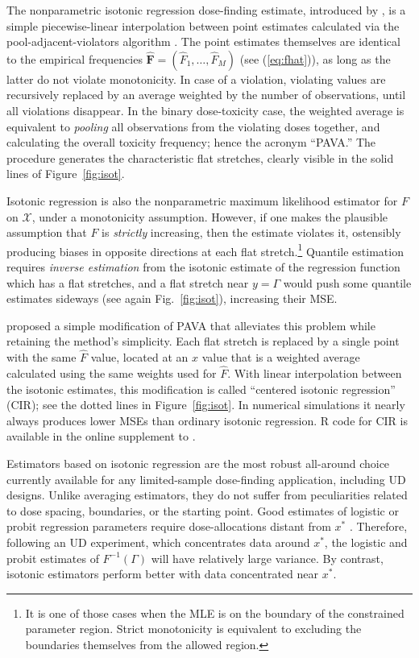 The nonparametric isotonic regression dose-finding estimate, introduced by \cite{Styl:Flou:dose:2002}, is a simple piecewise-linear interpolation between point estimates calculated via the pool-adjacent-violators algorithm \citep[PAVA,][]{BBBB:order:1972}. The point estimates themselves are identical to the empirical frequencies $\mathbf{\hat{F}}=\left(\hat{F}_1,\ldots,\hat{F}_M\right)$ (see (\ref{eq:fhat})), as long as the latter do not violate monotonicity. In case of a violation, violating values are recursively replaced by an average weighted by the number of observations, until all violations disappear. In the binary dose-toxicity case, the weighted average is equivalent to \emph{pooling} all observations from the violating doses together, and calculating the overall toxicity frequency; hence the acronym ``PAVA.'' The procedure generates the characteristic flat stretches, clearly visible in the solid lines of Figure~\ref{fig:isot}.

 Isotonic regression is also the nonparametric maximum likelihood estimator for $F$ on $\mathcal{X}$, under a monotonicity assumption. However, if one makes the plausible assumption that $F$ is \emph{strictly} increasing, then the estimate violates it, ostensibly producing biases in opposite directions at each flat stretch.\footnote{It is one of those cases when the MLE is on the boundary of the constrained parameter region. Strict monotonicity is equivalent to excluding the boundaries themselves from the allowed region.} Quantile estimation requires \emph{inverse estimation} from the isotonic estimate of the regression function which has a flat stretches, and a flat stretch near $y=\Gamma$ would push some quantile estimates sideways (see again Fig.~\ref{fig:isot}), increasing their MSE.

 \cite{Oron07} proposed a simple modification of PAVA that alleviates this problem while retaining the method's simplicity. Each flat stretch is replaced by a single point with the same $\hat{F}$ value, located at an $x$ value that is a weighted average calculated using the same weights used for $\hat{F}$. With linear interpolation between the isotonic estimates, this modification is called ``centered isotonic regression'' (CIR); see the dotted lines in Figure~\ref{fig:isot}. In numerical simulations it nearly always produces lower MSEs than ordinary isotonic regression. R code for CIR is available in the online supplement to \cite{Oron:Hoff:smal:2013}.

Estimators based on isotonic regression are the most robust all-around choice currently available for any limited-sample dose-finding application, including UD designs. Unlike averaging estimators, they do not suffer from peculiarities related to dose spacing, boundaries, or the starting point. Good estimates of logistic or probit regression parameters require dose-allocations distant from $x^*$ \citep{Ford:Tors:Wu:use:1992}. Therefore, following an UD experiment, which concentrates data around $x^*$, the logistic and probit estimates of $F^{-1}(\Gamma)$ will have relatively large variance. By contrast, isotonic estimators perform better with data concentrated near $x^*$.

